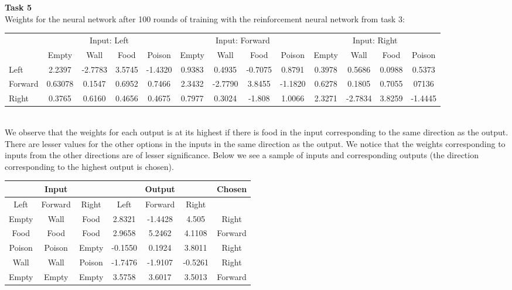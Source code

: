 \documentclass{article}
\begin{document}
\noindent
\textbf{Task 5} \\
Weights for the neural network after 100 rounds of training with the reinforcement neural network from task 3: \\
\begin{table}[h]
  \hspace{-1cm}
\begin{tabular}{l|cccc|cccc|cccc|}
\cline{2-13}
                              & \multicolumn{4}{c|}{Input: Left}     & \multicolumn{4}{c|}{Input: Forward}  & \multicolumn{4}{c|}{Input: Right}   \\ \cline{2-13} 
                              & Empty   & Wall    & Food   & Poison  & Empty  & Wall    & Food    & Poison  & Empty  & Wall    & Food   & Poison  \\ \hline
\multicolumn{1}{|l|}{Left}    & 2.2397  & -2.7783 & 3.5745 & -1.4320 & 0.9383 & 0.4935  & -0.7075 & 0.8791  & 0.3978 & 0.5686  & 0.0988 & 0.5373  \\ \hline
\multicolumn{1}{|l|}{Forward} & 0.63078 & 0.1547  & 0.6952 & 0.7466  & 2.3432 & -2.7790 & 3.8455  & -1.1820 & 0.6278 & 0.1805  & 0.7055 & 07136   \\ \hline
\multicolumn{1}{|l|}{Right}   & 0.3765  & 0.6160  & 0.4656 & 0.4675  & 0.7977 & 0.3024  & -1.808  & 1.0066  & 2.3271 & -2.7834 & 3.8259 & -1.4445 \\ \hline
\end{tabular}
\end{table}\\
We observe that the weights for each output is at its highest if there is food in the input corresponding to the same direction as the output. There are lesser values
for the other options in the inputs in the same direction as the output. We notice that the weights corresponding to inputs from the other directions are of lesser significance.
Below we see a sample of inputs and corresponding outputs (the direction corresponding to the highest output is chosen). 
\vspace{-1cm}
\begin{table}
\centering
\begin{tabular}{|ccc|ccc|c|}
\hline
\multicolumn{3}{|c|}{Input} & \multicolumn{3}{c|}{Output} & Chosen  \\ \hline
Left    & Forward  & Right  & Left    & Forward & Right   &         \\ \hline
Empty   & Wall     & Food   & 2.8321  & -1.4428 & 4.505   & Right   \\
Food    & Food     & Food   & 2.9658  & 5.2462  & 4.1108  & Forward \\
Poison  & Poison   & Empty  & -0.1550 & 0.1924  & 3.8011  & Right   \\
Wall    & Wall     & Poison & -1.7476 & -1.9107 & -0.5261 & Right   \\
Empty   & Empty    & Empty  & 3.5758  & 3.6017  & 3.5013  & Forward \\ \hline
\end{tabular}
\end{table}
\end{document}
